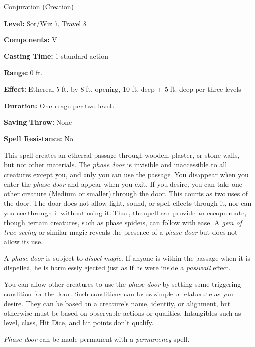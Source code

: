 
Conjuration (Creation)

\textbf{Level:} Sor/Wiz 7, Travel 8

\textbf{Components:} V

\textbf{Casting Time:} 1 standard action

\textbf{Range:} 0 ft.

\textbf{Effect:} Ethereal 5 ft. by 8 ft. opening, 10 ft. deep + 5 ft. deep per 
three levels

\textbf{Duration:} One usage per two levels

\textbf{Saving Throw:} None

\textbf{Spell Resistance:} No

This spell creates an ethereal passage through wooden, plaster, or stone walls, 
but not other materials. The \textit{phase door} is invisible and inaccessible 
to all creatures except you, and only you can use the passage. You disappear when 
you enter the \textit{phase door} and appear when you exit. If you desire, you 
can take one other creature (Medium or smaller) through the door. This counts as 
two uses of the door. The door does not allow light, sound, or spell effects through 
it, nor can you see through it without using it. Thus, the spell can provide an 
escape route, though certain creatures, such as phase spiders, can follow with 
ease. A \textit{gem of true seeing} or similar magic reveals the presence of a 
\textit{phase door} but does not allow its use.

A \textit{phase door} is subject to \textit{dispel magic}. If anyone is within 
the passage when it is dispelled, he is harmlessly ejected just as if he were inside 
a \textit{passwall} effect.

You can allow other creatures to use the \textit{phase door} by setting some triggering 
condition for the door. Such conditions can be as simple or elaborate as you desire. 
They can be based on a creature's name, identity, or alignment, but otherwise must 
be based on observable actions or qualities. Intangibles such as level, class, 
Hit Dice, and hit points don't qualify.

\textit{Phase door} can be made permanent with a \textit{permanency} spell.

